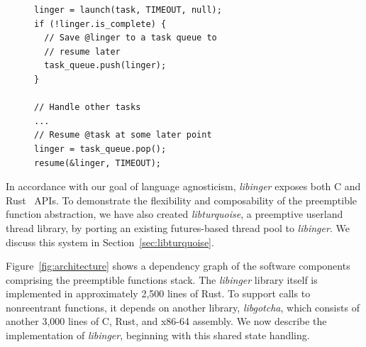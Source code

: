 \begin{figure}
\begin{lstlisting}[label=lst:usage, caption=Preemptible function usage example]
linger = launch(task, TIMEOUT, null);
if (!linger.is_complete) {
  // Save @linger to a task queue to
  // resume later
  task_queue.push(linger);
}

// Handle other tasks
...
// Resume @task at some later point
linger = task_queue.pop();
resume(&linger, TIMEOUT);
\end{lstlisting}
\end{figure}

In accordance with our goal of language agnosticism, \textit{libinger} exposes both C
and Rust~\cite{www-rustlang} APIs.  To demonstrate the flexibility and composability
of the preemptible function abstraction, we have also created \textit{libturquoise},
a preemptive userland thread library, by porting an existing futures-based thread
pool to \textit{libinger}.  We discuss this system in Section~\ref{sec:libturquoise}.

Figure~\ref{fig:architecture} shows a dependency graph of the software components
comprising the preemptible functions stack.  The \textit{libinger} library itself is
implemented in approximately 2,500 lines of Rust.  To support calls to nonreentrant
functions, it depends on another library, \textit{libgotcha}, which consists of
another 3,000 lines of C, Rust, and x86-64 assembly.  We now describe the
implementation of \textit{libinger}, beginning with this shared state handling.

